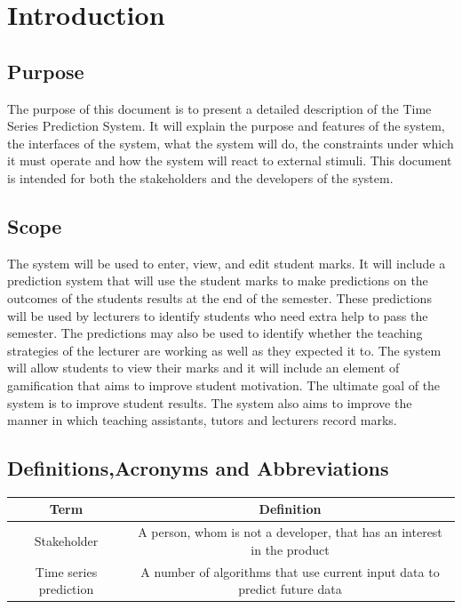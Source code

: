 \documentclass[a4paper,12pt]{article}
\begin{document}
    \tableofcontents
    \section{Introduction}
    	
        \subsection{Purpose}
        
The purpose of this document is to present a detailed description of the Time Series Prediction System. It will explain the purpose and features of the system, the interfaces of the system, what the system will do, the constraints under which it must operate and how the system will react to external stimuli. This document is intended for both the stakeholders and the developers of the system.
        \subsection{Scope}
The system will be used to enter, view, and edit student marks. It will include a prediction system that will use the student marks to make predictions on the outcomes of the students results at the end of the semester. These predictions will be used by lecturers to identify students who need extra help to pass the semester. The predictions may also be used to identify whether the teaching strategies of the lecturer are working as well as they expected it to. The system will allow students to view their marks and it will include an element of gamification that aims to improve student motivation. The ultimate goal of the system is to improve student results. The system also aims to improve the manner in which teaching assistants, tutors and lecturers record marks.
        \subsection{Definitions,Acronyms and Abbreviations}
        \begin{center}
\begin{tabular}{ |c|c| } 
\hline
Term & Definition \\
\hline
Stakeholder & A person, whom is not a developer, that has an interest in the product\\
\hline
Time series prediction & A number of algorithms that use current input data to predict future data\\
\hline
\end{tabular}
\end{center}
\end{document}
